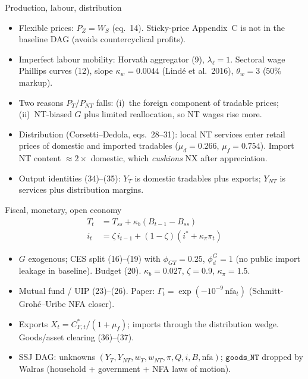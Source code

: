 \documentclass[11pt,aspectratio=169]{beamer}
\begin{document}
\begin{frame}{Production, labour, distribution}
  \begin{itemize}
    \item Flexible prices: $P_Z=W_S$ (eq.\ 14). Sticky-price Appendix~C is
          not in the baseline DAG (avoids countercyclical profits).
    \item Imperfect labour mobility: Horvath aggregator (9),
          $\lambda_{\ell}=1$. Sectoral wage Phillips curves (12), slope
          $\kappa_w=0.0044$ (Lind\'e et al.\ 2016), $\theta_w=3$ (50\% markup).
    \item Two reasons $P_T/P_{NT}$ falls: (i)~the foreign component of
          tradable prices; (ii)~NT-biased $G$ plus limited reallocation, so
          NT wages rise more.
    \item Distribution (Corsetti--Dedola, eqs.\ 28--31): local NT services
          enter retail prices of domestic and imported tradables
          ($\mu_d=0.266$, $\mu_f=0.754$). Import NT content $\approx 2\times$
          domestic, which \emph{cushions} NX after appreciation.
    \item Output identities (34)--(35): $Y_T$ is domestic tradables plus
          exports; $Y_{NT}$ is services plus distribution margins.
  \end{itemize}
\end{frame}

\begin{frame}{Fiscal, monetary, open economy}
  \begin{align}
    T_t &= T_{ss}+\kappa_b(B_{t-1}-B_{ss})
      \tag{tax, 21} \\[0.2em]
    i_t &= \zeta\, i_{t-1}+(1-\zeta)(i^\ast+\kappa_\pi\pi_t)
      \tag{Taylor, 22}
  \end{align}
  \begin{itemize}
    \item $G$ exogenous; CES split (16)--(19) with $\phi_{GT}=0.25$,
          $\phi^G_d=1$ (no public import leakage in baseline).
          Budget (20). $\kappa_b=0.027$, $\zeta=0.9$, $\kappa_\pi=1.5$.
    \item Mutual fund / UIP (23)--(26). Paper:
          $\Gamma_t=\exp(-10^{-9}\,\mathrm{nfa}_t)$
          (Schmitt-Groh\'e--Uribe NFA closer).
    \item Exports $X_t=C^\ast_{F,t}/(1+\mu_f)$; imports through the
          distribution wedge. Goods/asset clearing (36)--(37).
    \item SSJ DAG: unknowns $(Y_T,Y_{NT},w_T,w_{NT},\pi,Q,i,B,\mathrm{nfa})$;
          $\mathtt{goods\_NT}$ dropped by Walras (household + government +
          NFA laws of motion).
  \end{itemize}
\end{frame}
\end{document}
